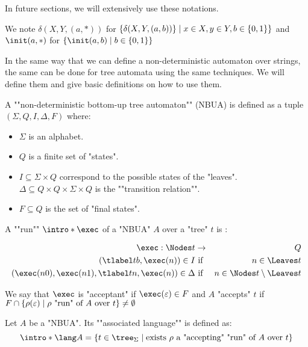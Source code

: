 \documentclass[a4paper,UKenglish,cleveref, autoref, thm-restate]{lipics-v2021}
\begin{document}
In future sections, we will extensively use these notations.

\begin{notation}
	We note $\delta(X,Y, (a, *))$ for $\{ \delta(X,Y,(a,b)) \}  \mid  x \in X, y \in Y, b \in \left\{0,1\right\}\}$ and
	$\init(a,*)$ for $\setdef{\init(a,b)} {b \in \set{0,1}}$
\end{notation}


In the same way that we can define a non-deterministic automaton over strings, the same can be done for
tree automata using the same techniques. We will define them and give basic definitions on how to use them.

\begin{definition}
	\AP A ""non-deterministic bottom-up tree automaton"" (NBUA) is defined as a tuple
	$(\Sigma, Q, I, \Delta, F)$ where:
	\begin{itemize}
		\item $\Sigma$ is an alphabet.
		\item $Q$ is a finite set of "states".
		\item $I \subseteq \Sigma \times Q$ correspond to the possible states of the "leaves".
		      \itemAP $\Delta \subseteq Q \times Q \times \Sigma \times Q$ is the ""transition relation"".
		\item $F \subseteq Q$ is the set of "final states".
	\end{itemize}
\end{definition}

\begin{definition}
	\AP A ""run"" $\intro* \exec$ of a "NBUA" $A$ over a "tree" $t$ is :

	\begin{eqnarray*}
		\exec : \Nodes t &\to& Q \\
		(\tlabel t b,  \exec (n) ) \in I &\text{ if }& n \in \Leaves t \\
		(\exec (n0), \exec (n1), \tlabel t n, \exec (n)) \in \Delta &\text{ if }& n \in \Nodes t \setminus \Leaves t
	\end{eqnarray*}

	We say that $\exec$ is "acceptant" if $\exec (\varepsilon) \in F$ and $A$ "accepts" $t$ if
	$F \cap \left\{\rho(\varepsilon) \mid \text{$\rho$ "run" of~$A$ over~$t$}\right\} \neq \emptyset$
\end{definition}


\begin{definition}
	\AP Let $A$ be a "NBUA". Its ""associated language"" is defined as:
	\[\intro* \lang A = \setdef {t \in \tree_{\Sigma}} {\text{exists $\rho$ a "accepting" "run" of $A$ over $t$}} \]
\end{definition}
\end{document}
